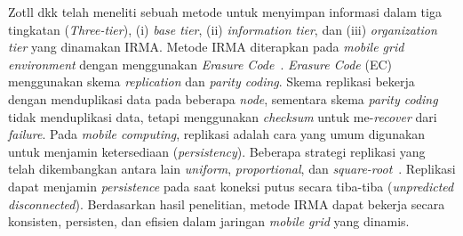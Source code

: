 Zotll dkk telah meneliti sebuah metode untuk menyimpan informasi dalam tiga tingkatan (\textit{Three-tier}), (i) \textit{base tier}, (ii) \textit{information tier}, dan (iii) \textit{organization tier} yang dinamakan IRMA. Metode IRMA diterapkan pada \textit{mobile grid environment} dengan menggunakan \textit{Erasure Code}~\cite{zottl_three-tier_2008}. \textit{Erasure Code} (EC)~\cite{weatherspoon_erasure_2002} menggunakan skema \textit{replication} dan \textit{parity coding}. Skema replikasi bekerja dengan menduplikasi data pada beberapa \textit{node}, sementara skema \textit{parity coding} tidak menduplikasi data, tetapi menggunakan \textit{checksum} untuk me-\textit{recover} dari \textit{failure}. Pada \textit{mobile computing}, replikasi adalah cara yang umum digunakan untuk menjamin ketersediaan (\textit{persistency}). Beberapa strategi replikasi yang telah dikembangkan antara lain \textit{uniform}, \textit{proportional}, dan \textit{square-root}~\cite{lv_search_2002}. Replikasi dapat menjamin \textit{persistence} pada saat koneksi putus secara tiba-tiba (\textit{unpredicted disconnected}). Berdasarkan hasil penelitian, metode IRMA dapat bekerja secara konsisten, persisten, dan efisien dalam jaringan \textit{mobile grid} yang dinamis.

